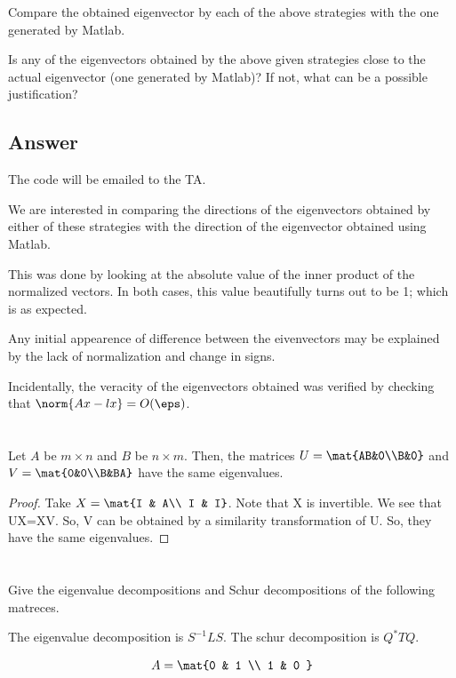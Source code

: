 \documentclass[10pt]{amsart}
\begin{document}
Compare the obtained eigenvector by each of the above strategies with the one generated by Matlab.

Is any of the eigenvectors obtained by the above given strategies close to the actual eigenvector (one generated by Matlab)? If not, what can be a possible justification?

\subsection{Answer}
The code will be emailed to the TA.

We are interested in comparing the directions of the eigenvectors obtained by either of these strategies with the direction of the eigenvector obtained using Matlab.

This was done by looking at the absolute value of the inner product of the normalized vectors. In both cases, this value beautifully turns out to be 1; which is as expected.

Any initial appearence of difference between the eivenvectors may be explained by the lack of normalization and change in signs.

Incidentally, the veracity of the eigenvectors obtained was verified by checking that $\norm{Ax-lx} = O(\eps)$.

\section{}
\begin{thm}
Let $A$ be $m\times n$ and $B$ be $n\times m$. Then, the matrices $U = \mat{AB&0\\B&0}$ and $V = \mat{0&0\\B&BA}$ have the same eigenvalues. 
\end{thm}
\begin{proof}
Take $X = \mat{I & A\\ I & I}$. Note that X is invertible. We see that UX=XV. So, V can be obtained by a similarity transformation of U. So, they have the same eigenvalues.
\end{proof}

\section{}
Give the eigenvalue decompositions and Schur 
    decompositions of the following matreces.

\begin{notation}
The eigenvalue decomposition is $S^{-1}LS$. The schur decomposition is $Q^{*}TQ$.
\end{notation}
$$
    A = \mat{0 & 1  \\  1 & 0 }
$$
\end{document}
